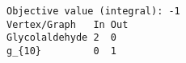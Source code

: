 \begin{verbatim}
Objective value (integral): -1
Vertex/Graph   In Out 
Glycolaldehyde 2  0   
g_{10}         0  1   
\end{verbatim}
